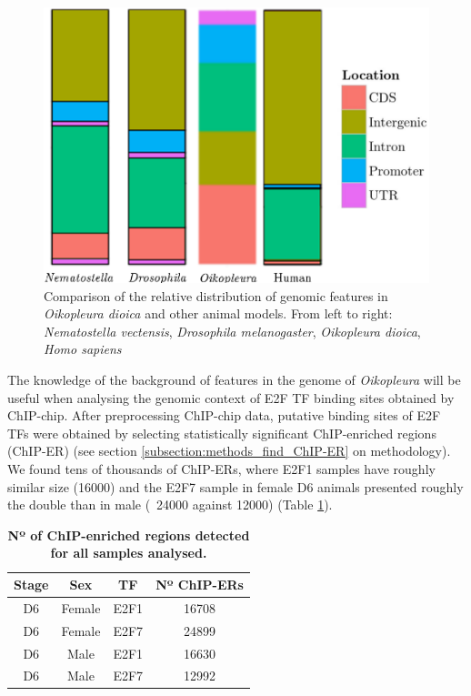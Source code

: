 \documentclass[11pt,twoside,a4paper]{report}
\begin{document}
		\begin{figure}[here]
			\setlength{\belowcaptionskip}{5pt}
			\centering
			\includegraphics[height=0.3\textwidth]{pngs/species_genome2.png}
			\caption[Comparison of the distribution of genomic features in \textit{Oikopleura} and other animal models]
			{Comparison of the relative distribution of genomic features in \textit{Oikopleura dioica} and other animal models.
			{\footnotesize
				From left to right:
					\textit{Nematostella vectensis},
					\textit{Drosophila melanogaster},
					\textit{Oikopleura dioica},
					\textit{Homo sapiens}
				}
			}
			\label{fig:genome_background}
		\end{figure}
		
		The knowledge of the background of features in the genome of \textit{Oikopleura} will be useful when analysing the genomic context of E2F TF binding sites obtained by ChIP-chip. After preprocessing ChIP-chip data, putative binding sites of E2F TFs were obtained by selecting statistically significant ChIP-enriched regions (ChIP-ER) (see section \ref{subsection:methods_find_ChIP-ER} on methodology). We found tens of thousands of ChIP-ERs, where E2F1 samples have roughly similar size (16000) and the E2F7 sample in female D6 animals presented roughly the double than in male (~24000 against 12000) (Table \ref{table:No_ChIP-ERs}).
		
		
		\begin{table}[H]
       		\caption{\bf{Nº of ChIP-enriched regions detected for all samples analysed.}}
       		\begin{center}
           		\begin{tabular}{c|c|c|c}
                	\textbf{Stage} & \textbf{Sex} & \textbf{TF} & \textbf{Nº ChIP-ERs}\\
   		            \hline
       		        D6 & Female & E2F1 & 16708\\
           		    D6 & Female & E2F7 & 24899 \\
					D6 & Male & E2F1 & 16630\\
					D6 & Male & E2F7 & 12992\\
            	\end{tabular}
   		    \end{center}
   		    \label{table:No_ChIP-ERs}
	    \end{table}
		    		
\end{document}
